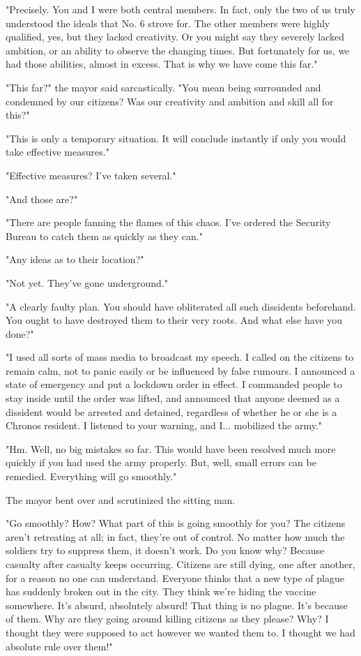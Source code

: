 "Precisely. You and I were both central members. In fact, only the two
of us truly understood the ideals that No. 6 strove for. The other
members were highly qualified, yes, but they lacked creativity. Or you
might say they severely lacked ambition, or an ability to observe the
changing times. But fortunately for us, we had those abilities, almost
in excess. That is why we have come this far."

"This far?" the mayor said sarcastically. "You mean being surrounded and
condemned by our citizens? Was our creativity and ambition and skill all
for this?"

"This is only a temporary situation. It will conclude instantly if only
you would take effective measures."

"Effective measures? I've taken several."

"And those are?"

"There are people fanning the flames of this chaos. I've ordered the
Security Bureau to catch them as quickly as they can."

"Any ideas as to their location?"

"Not yet. They've gone underground."

"A clearly faulty plan. You should have obliterated all such dissidents
beforehand. You ought to have destroyed them to their very roots. And
what else have you done?"

"I used all sorts of mass media to broadcast my speech. I called on the
citizens to remain calm, not to panic easily or be influenced by false
rumours. I announced a state of emergency and put a lockdown order in
effect. I commanded people to stay inside until the order was lifted,
and announced that anyone deemed as a dissident would be arrested and
detained, regardless of whether he or she is a Chronos resident. I
listened to your warning, and I... mobilized the army."

"Hm. Well, no big mistakes so far. This would have been resolved much
more quickly if you had used the army properly. But, well, small errors
can be remedied. Everything will go smoothly."

The mayor bent over and scrutinized the sitting man.

"Go smoothly? How? What part of this is going smoothly for you? The
citizens aren't retreating at all; in fact, they're out of control. No
matter how much the soldiers try to suppress them, it doesn't work. Do
you know why? Because casualty after casualty keeps occurring. Citizens
are still dying, one after another, for a reason no one can understand.
Everyone thinks that a new type of plague has suddenly broken out in the
city. They think we're hiding the vaccine somewhere. It's absurd,
absolutely absurd! That thing is no plague. It's because of them. Why
are they going around killing citizens as they please? Why? I thought
they were supposed to act however we wanted them to. I thought we had
absolute rule over them!"

